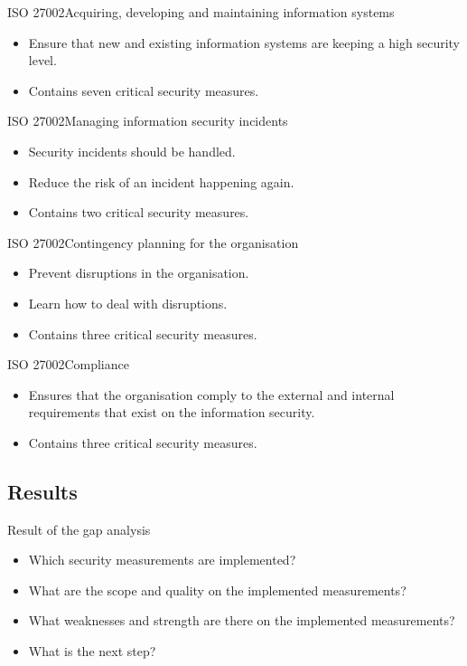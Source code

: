 \documentclass{beamer}
\begin{document}
\begin{frame}{ISO 27002}{Acquiring, developing and maintaining information systems}
  \begin{itemize}
    \item Ensure that new and existing information systems are keeping a high
      security level.
    \item Contains seven critical security measures.
  \end{itemize}
\end{frame}

\begin{frame}{ISO 27002}{Managing information security incidents}
  \begin{itemize}
    \item Security incidents should be handled.
    \item Reduce the risk of an incident happening again.
    \item Contains two critical security measures.
  \end{itemize}
\end{frame}

\begin{frame}{ISO 27002}{Contingency planning for the organisation}
  \begin{itemize}
    \item Prevent disruptions in the organisation.
    \item Learn how to deal with disruptions.
    \item Contains three critical security measures.
  \end{itemize}
\end{frame}

\begin{frame}{ISO 27002}{Compliance}
  \begin{itemize}
    \item Ensures that the organisation comply to the external and internal
      requirements that exist on the information security.
    \item Contains three critical security measures.
  \end{itemize}
\end{frame}

\subsection{Results}

\begin{frame}{Result of the gap analysis}
  \begin{itemize}
    \item Which security measurements are implemented?
    \item What are the scope and quality on the implemented measurements?
    \item What weaknesses and strength are there on the implemented
      measurements?
    \item What is the next step\@?
  \end{itemize}
\end{frame}
\end{document}
